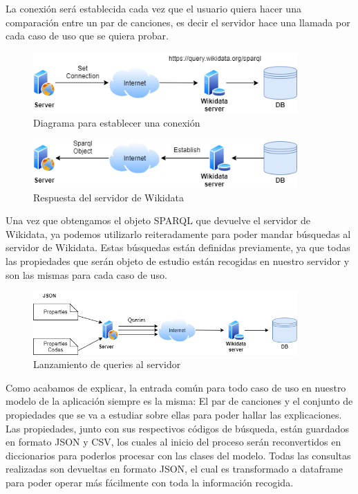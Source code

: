 La conexión será establecida cada vez que el usuario quiera hacer una comparación entre un par de canciones, es decir el servidor hace una llamada por cada caso de uso que se quiera probar.\\

\begin{figure}[h!]
	\centering
	\includegraphics[width = 0.9\textwidth]{Imagenes/Bitmap/setConnection.png}
	\caption{Diagrama para establecer una conexión}
	\label{fig:diagramaConexion}
\end{figure}

\begin{figure}[h!]
	\centering
	\includegraphics[width = 0.9\textwidth]{Imagenes/Bitmap/conexionReturn.png}
	\caption{Respuesta del servidor de Wikidata}
	\label{fig:respuestaWikidata}
\end{figure}

Una vez que obtengamos el objeto SPARQL que devuelve el servidor de Wikidata, ya podemos utilizarlo reiteradamente para poder mandar búsquedas al servidor de Wikidata. Estas búsquedas están definidas previamente, ya que todas las propiedades que serán objeto de estudio están recogidas en nuestro servidor y son las mismas para cada caso de uso. 
\\

\begin{figure}[h!]
	\centering
	\includegraphics[width = 0.9\textwidth]{Imagenes/Bitmap/conexion.png}
	\caption{Lanzamiento de queries al servidor}
	\label{fig:queriesServidor}
\end{figure}

Como acabamos de explicar, la entrada común para todo caso de uso en nuestro modelo de la aplicación siempre es la misma: El par de canciones y el conjunto de propiedades que se va a estudiar sobre ellas para poder hallar las explicaciones. Las propiedades, junto con sus respectivos códigos de búsqueda, están guardados en formato JSON y CSV, los cuales al inicio del proceso serán reconvertidos en diccionarios para poderlos procesar con las clases del modelo. Todas las consultas realizadas son devueltas en formato JSON, el cual es transformado a dataframe para poder operar más fácilmente con toda la información recogida.\\


